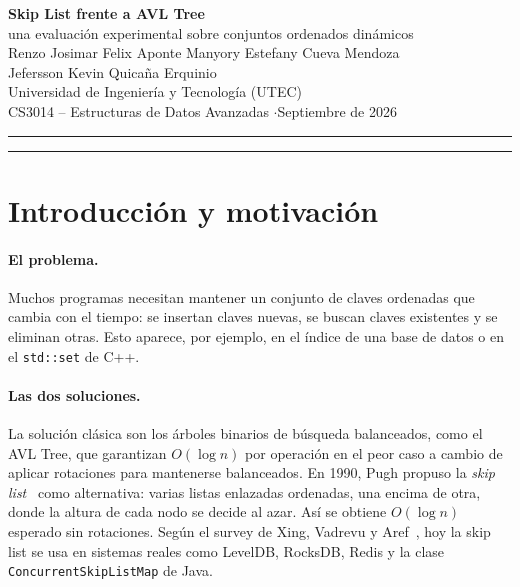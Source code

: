 \documentclass[11pt,a4paper]{article}
\begin{document}
\thispagestyle{empty}
\begin{center}
  {\LARGE\bfseries Skip List frente a AVL Tree}\\[5pt]
  {\large una evaluación experimental sobre conjuntos ordenados dinámicos}\\[14pt]
  {\normalsize Renzo Josimar Felix Aponte \qquad Manyory Estefany Cueva Mendoza}\\[2pt]
  {\normalsize Jefersson Kevin Quicaña Erquinio}\\[6pt]
  {\small Universidad de Ingeniería y Tecnología (UTEC)}\\
  {\small CS3014 -- Estructuras de Datos Avanzadas \quad$\cdot$\quad Septiembre de 2026}
\end{center}
\vspace{2pt}
\noindent\rule{\textwidth}{0.4pt}

\begin{abstract}
\noindent
Proponemos implementar desde cero una Skip List y un AVL Tree y comparar
experimentalmente su tiempo de búsqueda, inserción y eliminación, con tamaños
de entrada entre $10^3$ y $10^6$ y datos en orden aleatorio, ordenado e
inverso. Ambas estructuras tienen costo $O(\log n)$ (esperado en la skip list,
de peor caso en el AVL); queremos ver cómo se comportan en la
práctica, sin partir de que una es mejor que la otra.
\end{abstract}
\noindent\rule{\textwidth}{0.4pt}

\section{Introducción y motivación}

\paragraph{El problema.}
Muchos programas necesitan mantener un conjunto de claves ordenadas que cambia
con el tiempo: se insertan claves nuevas, se buscan claves existentes y se
eliminan otras. Esto aparece, por ejemplo, en el índice de una base de datos o en
el \texttt{std::set} de C++.

\paragraph{Las dos soluciones.}
La solución clásica son los árboles binarios de búsqueda balanceados, como el
AVL Tree, que garantizan $O(\log n)$ por operación en el peor caso a cambio
de aplicar rotaciones para mantenerse balanceados. En 1990, Pugh propuso la
\emph{skip list}~\cite{pugh1990} como alternativa: varias listas enlazadas
ordenadas, una encima de otra, donde la altura de cada nodo se decide al azar.
Así se obtiene $O(\log n)$ esperado sin rotaciones. Según el survey de
Xing, Vadrevu y Aref~\cite{vadrevu2024}, hoy la skip list se usa en sistemas
reales como LevelDB, RocksDB, Redis y la clase
\texttt{ConcurrentSkipListMap} de Java.
\end{document}
